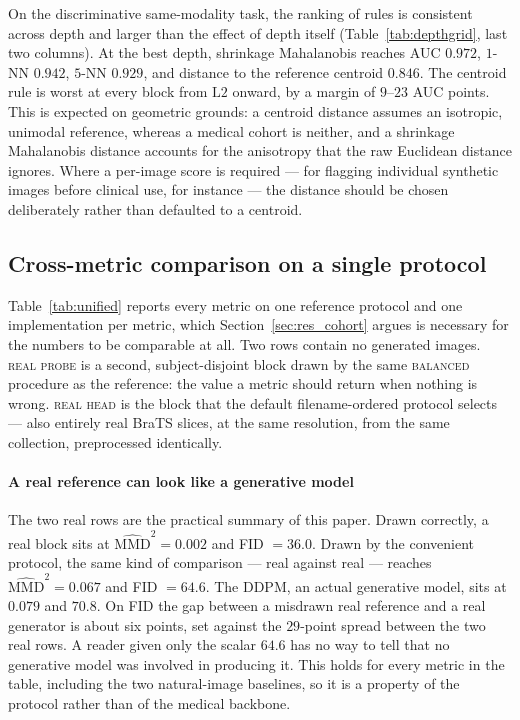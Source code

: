 \documentclass[preprint,12pt,authoryear]{elsarticle}
\newcommand{\mmd}{\mathrm{MMD}}
\newcommand{\Lb}[1]{\ensuremath{\mathrm{L}#1}}
\begin{document}
On the discriminative same-modality task, the ranking of rules is consistent
across depth and larger than the effect of depth itself
(Table~\ref{tab:depthgrid}, last two columns). At the best depth, shrinkage
Mahalanobis reaches AUC $0.972$, $1$-NN $0.942$, $5$-NN $0.929$, and distance to
the reference centroid $0.846$. The centroid rule is worst at every block from
\Lb{2} onward, by a margin of $9$--$23$ AUC points. This is expected on
geometric grounds: a centroid distance assumes an isotropic, unimodal reference,
whereas a medical cohort is neither, and a shrinkage Mahalanobis distance
accounts for the anisotropy that the raw Euclidean distance ignores. Where a
per-image score is required --- for flagging individual synthetic images before
clinical use, for instance --- the distance should be chosen deliberately rather
than defaulted to a centroid.
\subsection{Cross-metric comparison on a single protocol}
\label{sec:res_baselines}

Table~\ref{tab:unified} reports every metric on one reference protocol and one
implementation per metric, which Section~\ref{sec:res_cohort} argues is
necessary for the numbers to be comparable at all. Two rows contain no
generated images. \textsc{real probe} is a second, subject-disjoint block drawn
by the same \textsc{balanced} procedure as the reference: the value a metric
should return when nothing is wrong. \textsc{real head} is the block that the
default filename-ordered protocol selects --- also entirely real BraTS slices,
at the same resolution, from the same collection, preprocessed identically.

\paragraph{A real reference can look like a generative model}
The two real rows are the practical summary of this paper. Drawn correctly, a
real block sits at $\widehat{\mmd}^2 = 0.002$ and FID $= 36.0$. Drawn by the
convenient protocol, the same kind of comparison --- real against real ---
reaches $\widehat{\mmd}^2 = 0.067$ and FID $= 64.6$. The DDPM, an actual
generative model, sits at $0.079$ and $70.8$. On FID the gap between a misdrawn
real reference and a real generator is about six points, set against the
$29$-point spread between the two real rows. A reader given only the scalar
$64.6$ has no way to tell that no generative model was involved in producing
it. This holds for every metric in the table, including the two
natural-image baselines, so it is a property of the protocol rather than of the
medical backbone.
\end{document}
